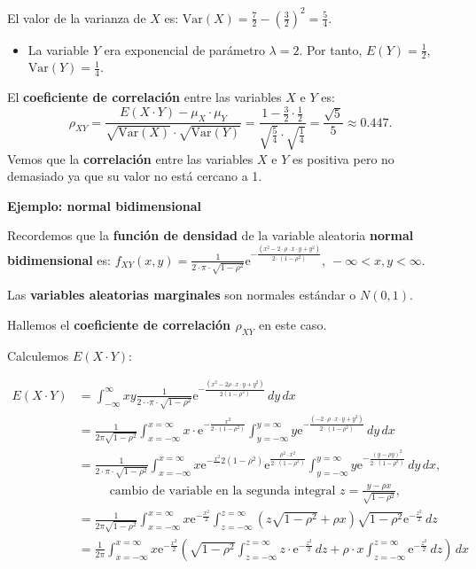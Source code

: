 \documentclass[
  letterpaper,
  DIV=11,
  numbers=noendperiod]{scrreprt}
\providecommand{\tightlist}{%
  \setlength{\itemsep}{0pt}\setlength{\parskip}{0pt}}\usepackage{longtable,booktabs,array}
\begin{document}
El valor de la varianza de \(X\) es:
\(\mathrm{Var}(X)=\frac{7}{2}-\left(\frac{3}{2}\right)^2 = \frac{5}{4}.\)

\begin{itemize}
\tightlist
\item
  La variable \(Y\) era exponencial de parámetro \(\lambda =2\). Por
  tanto, \(E(Y)=\frac{1}{2}\), \(\mathrm{Var}(Y)=\frac{1}{4}\).
\end{itemize}

El \textbf{coeficiente de correlación} entre las variables \(X\) e \(Y\)
es: \[
\rho_{XY}=\frac{E(X\cdot Y)-\mu_X\cdot \mu_Y}{\sqrt{\mathrm{Var}(X)}\cdot\sqrt{\mathrm{Var}(Y)}}=\frac{1-\frac{3}{2}\cdot \frac{1}{2}}{\sqrt{\frac{5}{4}}\cdot\sqrt{\frac{1}{4}}}=\frac{\sqrt{5}}{5}\approx 0.447.
\] Vemos que la \textbf{correlación} entre las variables \(X\) e \(Y\)
es positiva pero no demasiado ya que su valor no está cercano a 1.

\textbf{Ejemplo: normal bidimensional}

Recordemos que la \textbf{función de densidad} de la variable aleatoria
\textbf{normal bidimensional} es:
\(f_{XY}(x,y)=\frac{1}{2\cdot \pi\cdot \sqrt{1-\rho^2}}\mathrm{e}^{-\frac{(x^2-2\cdot \rho \cdot x\cdot y+y^2)}{2\cdot (1-\rho^2)}},\ -\infty <x,y<\infty.\)

Las \textbf{variables aleatorias marginales} son normales estándar o
\(N(0,1)\).

Hallemos el \textbf{coeficiente de correlación \(\rho_{XY}\)} en este
caso.

Calculemos \(E(X\cdot Y)\):

\[
\begin{array}{rl}
E(X\cdot Y) & = \displaystyle\int_{-\infty}^\infty x y \frac{1}{2\cdot\cdot\pi\cdot\sqrt{1-\rho^2}}\mathrm{e}^{-\frac{(x^2-2\rho\cdot x\cdot y+y^2)}{2(1-\rho^2)}}\, dy\, dx \\
& = \displaystyle\frac{1}{2\pi\sqrt{1-\rho^2}}\int_{x=-\infty}^{x=\infty}x\cdot  \mathrm{e}^{-\frac{x^2}{2\cdot(1-\rho^2)}}\int_{y=-\infty}^{y=\infty}y \mathrm{e}^{-\frac{(-2\cdot\rho\cdot  x\cdot y+y^2)}{2\cdot(1-\rho^2)}}\, dy\, dx \\ & = \displaystyle\frac{1}{2\cdot\pi\cdot\sqrt{1-\rho^2}}\int_{x=-\infty}^{x=\infty}x  \mathrm{e}^{-\frac{x^2}\cdot{2(1-\rho^2)}}  \mathrm{e}^{\frac{\rho^2\cdot x^2}{2\cdot(1-\rho^2)}} \int_{y=-\infty}^{y=\infty}y \mathrm{e}^{-\frac{(y-\rho y)^2}{2\cdot(1-\rho^2)}}\, dy\, dx,\\ &\ \qquad\mbox{ cambio de variable en la segunda integral } z=\frac{y-\rho x}{\sqrt{1-\rho^2}},\\
& = \displaystyle\frac{1}{2\pi\sqrt{1-\rho^2}}\int_{x=-\infty}^{x=\infty}x  \mathrm{e}^{-\frac{x^2}{2}}  \int_{z=-\infty}^{z=\infty} \left(z \sqrt{1-\rho^2}+\rho x\right) \sqrt{1-\rho^2}\mathrm{e}^{-\frac{z^2}{2}}\, dz\, \\
& = \displaystyle\frac{1}{2\pi} \int_{x=-\infty}^{x=\infty}x  \mathrm{e}^{-\frac{x^2}{2}}\left(\sqrt{1-\rho^2}\int_{z=-\infty}^{z=\infty} z\cdot \mathrm{e}^{-\frac{z^2}{2}}\, dz +\rho\cdot x \int_{z=-\infty}^{z=\infty}\mathrm{e}^{-\frac{z^2}{2}}\, dz \right)\, dx
\end{array}
\]
\end{document}

